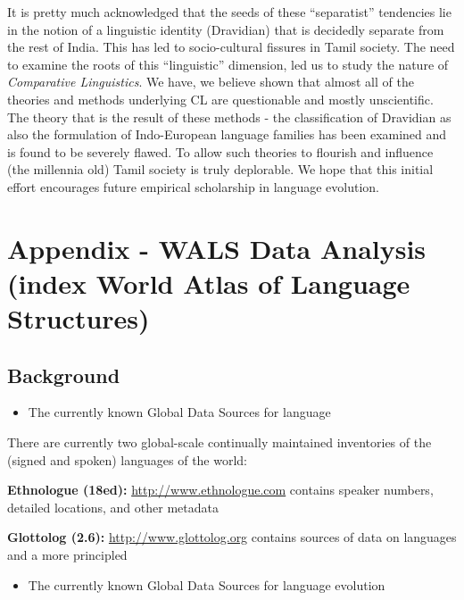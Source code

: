 It is pretty much acknowledged that the seeds of these “separatist” tendencies lie in the notion of a linguistic identity (Dravidian) that is decidedly separate from the rest of India. This has led to socio-cultural fissures in Tamil society. The need to examine the roots of this “linguistic” dimension, led us to study the nature of \textit{Comparative Linguistics}. We have, we believe shown that almost all of the theories and methods underlying CL are questionable and mostly unscientific. The theory that is the result of these methods - the classification of Dravidian as also the formulation of Indo-European language families has been examined and is found to be severely flawed. To allow such theories to flourish and influence (the millennia old) Tamil society is truly deplorable. We hope that this initial effort encourages future empirical scholarship in language evolution.


\section*{Appendix - WALS Data Analysis (index World Atlas of Language Structures)}

\subsection*{Background\protect{}}

\begin{itemize}
\item The currently known Global Data Sources for language

\end{itemize}

There are currently two global-scale continually maintained inventories of the (signed and spoken) languages of the world:

\textbf{Ethnologue (18ed):} \url{http://www.ethnologue.com} contains speaker numbers, detailed locations, and other metadata

\textbf{Glottolog (2.6):} \url{http://www.glottolog.org} contains sources of data on languages and a more principled

\begin{itemize}
\item The currently known Global Data Sources for language evolution

\end{itemize}

